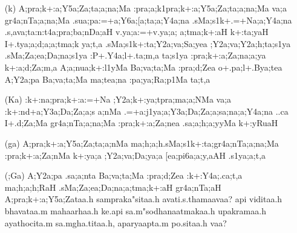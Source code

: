 \item[{\sktf 24}.] \begin{itemize}
           
          \item[({\sktf k})] {\sktf A;pra;k+:a;Y5a;Za;ta;a;na;Ma
:pra;a;k1pra;k+:a;Y5a;Za;ta;a;na;Ma va;a gr4a;nTa;a;na;Ma
.sua;pa:=+a;Y6a;[a;ta;a;Y4a;na .sMa;s1k+.=+Na;a;Y4a;na\ZF{,} .s,ava;ta:n:t4a;pra;ba;nDa;aH\ZF{,} v.ya;a:=+v.ya;a;%
a;tma;k+:aH} {\sktf k+:ta;yaH%
\ZF{-}I+.tya;a;d;a;a;tma;k ya;t,a} {\sktf
.sMa;s1k+:ta;Y2a;va;Sa;yea ;Y2a;va;Y2a;h;ta;s1ya
.sMa;Za;ea;Da;na;s1ya :P+.Y4a;l+.ta;m,a\ZF{,} ta;s1ya :pra;k+:a;Za;na;a;ya
k+:a;d;Za;m,a A;a;nua;k+:l1yMa
Ba;va;ta;Ma :pra;d;Zea o+.pa;l+.Bya;tea  A;Y2a;pa Ba;va;ta;Ma
ma;tea;na :pa;ya;Ra;p1Ma ta;t,a} 
           
          \item[({\sktf Ka})] {\sktf :k+:na;pra;k+:a:=+Na
;Y2a;k+:ya;tpra;ma;a;NMa va;a :k+:nd+a;Y3a;Da;Za;a;s%
a;nMa .=+a:j1ya;a;Y3a;Da;Za;a;sa;na;a;Y4a;na ..ca I+.d;Za;Ma gr4a;nTa;a;na;Ma :pra;k+:a;Za;nea .sa;a;h;a;yyMa k+:yRuaH%
} 
          
          \item[({\sktf ga})] {\sktf A;pra;k+:a;Y5a;Za;ta;a;nMa
ma;h;a;h}{\sktf .sMa;s1k+:ta;gr4a;nTa;a;na;Ma
:pra;k+:a;Za;nMa k+:ya;a ;Y2a;va;Da;ya;a [ea;pi6a;a;y,aAH .s1ya;a;t,a }
          
          \item[({\sktf ;Ga})] {\sktf A;Y2a;pa .sa;a;nta
Ba;va;ta;Ma :pra;d;Zea :k+:Y4a;.ca;t,a ma;h;a;h;RaH
.sMa;Za;ea;Da;na;a;tma;k+:aH gr4a;nTa;aH A;pra;k+:a;Y5a;Za}{\sktf taa.h sampraka"sitaa.h avati.s.thamaavaa? api viditaa.h bhavataa.m mahaarhaa.h ke.api sa.m"sodhanaatmakaa.h upakramaa.h ayathocita.m sa.mgha.titaa.h, aparyaapta.m po.sitaa.h vaa?}
          \end{itemize}

